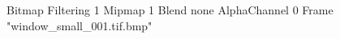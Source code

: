 {Bitmap
	{Filtering 1}
	{Mipmap 1}
	{Blend none}
	{AlphaChannel 0}
	{Frame "window_small_001.tif.bmp"}
}
